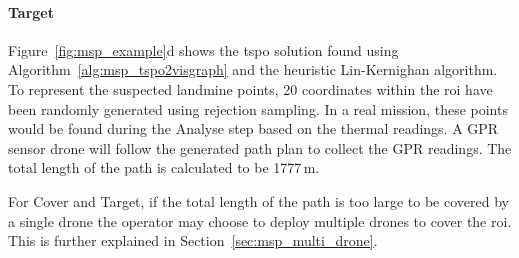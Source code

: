 \paragraph{Target} Figure~\ref{fig:msp_example}d shows the \gls{tspo} solution found using Algorithm~\ref{alg:msp_tspo2visgraph} and the heuristic Lin-Kernighan algorithm. To represent the suspected landmine points, 20 coordinates within the \gls{roi} have been randomly generated using rejection sampling. In a real mission, these points would be found during the Analyse step based on the thermal readings. A \gls{GPR} sensor drone will follow the generated path plan to collect the \gls{GPR} readings. The total length of the path is calculated to be 1777\,m.

For Cover and Target, if the total length of the path is too large to be covered by a single drone the operator may choose to deploy multiple drones to cover the \gls{roi}. This is further explained in Section~\ref{sec:msp_multi_drone}. 

